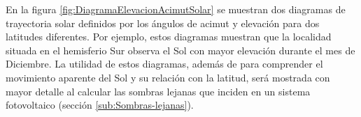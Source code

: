 En la figura \ref{fig:DiagramaElevacionAcimutSolar} se muestran dos
diagramas de trayectoria solar definidos por los ángulos de acimut
y elevación para dos latitudes diferentes. Por ejemplo, estos diagramas
muestran que la localidad situada en el hemisferio Sur observa el
Sol con mayor elevación durante el mes de Diciembre. La utilidad de
estos diagramas, además de para comprender el movimiento aparente
del Sol y su relación con la latitud, será mostrada con mayor detalle
al calcular las sombras lejanas que inciden en un sistema fotovoltaico
(sección \ref{sub:Sombras-lejanas}).


\begin{figure}
\begin{centering}
\hfill{}\hfill{}
\end{centering}
\end{figure}
